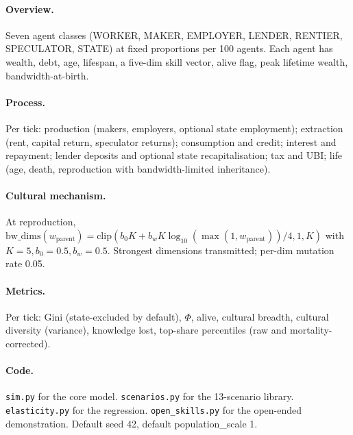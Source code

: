 \documentclass[11pt]{article}
\begin{document}
\paragraph{Overview.}
Seven agent classes (WORKER, MAKER, EMPLOYER, LENDER, RENTIER,
SPECULATOR, STATE) at fixed proportions per 100 agents. Each agent
has wealth, debt, age, lifespan, a five-dim skill vector, alive flag,
peak lifetime wealth, bandwidth-at-birth.

\paragraph{Process.}
Per tick: production (makers, employers, optional state
employment); extraction (rent, capital return, speculator returns);
consumption and credit; interest and repayment; lender deposits and
optional state recapitalisation; tax and UBI; life (age, death,
reproduction with bandwidth-limited inheritance).

\paragraph{Cultural mechanism.}
At reproduction, $\text{bw\_dims}(w_{\text{parent}}) = \text{clip}(
b_0 K + b_w K \log_{10}(\max(1, w_{\text{parent}}))/4, 1, K)$ with
$K=5, b_0=0.5, b_w=0.5$. Strongest dimensions transmitted;
per-dim mutation rate 0.05.

\paragraph{Metrics.}
Per tick: Gini (state-excluded by default), $\Phi$, alive, cultural
breadth, cultural diversity (variance), knowledge lost, top-share
percentiles (raw and mortality-corrected).

\paragraph{Code.} \texttt{sim.py} for the core model.
\texttt{scenarios.py} for the 13-scenario library. \texttt{elasticity.py}
for the regression. \texttt{open\_skills.py} for the open-ended
demonstration. Default seed 42, default population\_scale 1.
\end{document}
